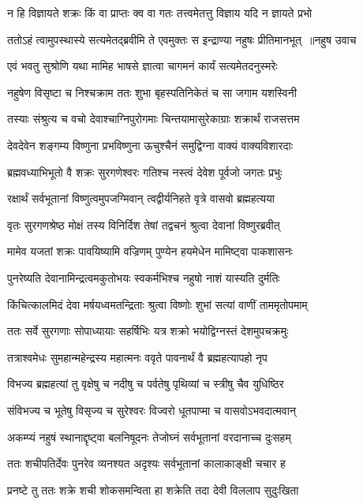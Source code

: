 \twolineshloka
{न हि विज्ञायते शक्रः किं वा प्राप्तः क्व वा गतः}
{तत्त्वमेतत्तु विज्ञाय यदि न ज्ञायते प्रभो}


\threelineshloka
{ततोऽहं त्वामुपस्थास्ये सत्यमेतद्ब्रवीमि ते}
{एवमुक्तः स इन्द्राण्या नहुषः प्रीतिमानभूत् ॥नहुष उवाच}
{}


\twolineshloka
{एवं भवतु सुश्रोणि यथा मामिह भाषसे}
{ज्ञात्वा चागमनं कार्यं सत्यमेतदनुस्मरेः}


\twolineshloka
{नहुषेण विसृष्टा च निश्चक्राम ततः शुभा}
{बृहस्पतिनिकेतं च सा जगाम यशस्विनी}


\twolineshloka
{तस्याः संश्रुत्य च वचो देवाश्चाग्निपुरोगमाः}
{चिन्तयामासुरेकाग्राः शक्रार्थं राजसत्तम}


\twolineshloka
{देवदेवेन शङ्गम्य विष्णुना प्रभविष्णुना}
{ऊचुश्चैनं समुद्विग्ना वाक्यं वाक्यविशारदाः}


\twolineshloka
{ब्रह्मवध्याभिभूतो वै शक्रः सुरगणेश्वरः}
{गतिश्च नस्त्वं देवेश पूर्वजो जगतः प्रभुः}


\twolineshloka
{रक्षार्थं सर्वभूतानां विष्णुत्वमुपजग्मिवान्}
{त्वद्वीर्यनिहते वृत्रे वासवो ब्रह्महत्यया}


\twolineshloka
{वृतः सुरगणश्रेष्ठ मोक्षं तस्य विनिर्दिश}
{तेषां तद्वचनं श्रुत्वा देवानां विष्णुरब्रवीत्}


\twolineshloka
{मामेव यजतां शक्रः पावयिष्यामि वज्रिणम्}
{पुण्येन हयमेधेन मामिष्ट्वा पाकशासनः}


\twolineshloka
{पुनरेष्यति देवानामिन्द्रत्वमकुतोभयः}
{स्वकर्मभिश्च नहुषो नाशं यास्यति दुर्मतिः}


\threelineshloka
{किंचित्कालमिदं देवा मर्षयध्वमतन्द्रिताः}
{श्रुत्वा विष्णोः शुभां सत्यां वाणीं ताममृतोपमाम्}
{}


\twolineshloka
{ततः सर्वे सुरगणाः सोपाध्यायाः सहर्षिभिः}
{यत्र शक्रो भयोद्विग्नस्तं देशमुपचक्रमुः}


\twolineshloka
{तत्राश्वमेधः सुमहान्महेन्द्रस्य महात्मनः}
{ववृते पावनार्थं वै ब्रह्महत्यापहो नृप}


\twolineshloka
{विभज्य ब्रह्महत्यां तु वृक्षेषु च नदीषु च}
{पर्वतेषु पृथिव्यां च स्त्रीषु चैव युधिष्ठिर}


\twolineshloka
{संविभज्य च भूतेषु विसृज्य च सुरेश्वरः}
{विज्वरो धूतपाप्मा च वासवोऽभवदात्मवान्}


\twolineshloka
{अकम्प्यं नहुषं स्थानाद्दृष्ट्वा बलनिषूदनः}
{तेजोघ्नं सर्वभूतानां वरदानाच्च दुःसहम्}


\twolineshloka
{ततः शचीपतिर्देवः पुनरेव व्यनश्यत}
{अदृश्यः सर्वभूतानां कालाकाङ्क्षी चचार ह}


\twolineshloka
{प्रनष्टे तु ततः शक्रे शची शोकसमन्विता}
{हा शक्रेति तदा देवी विललाप सुदुःखिता}


